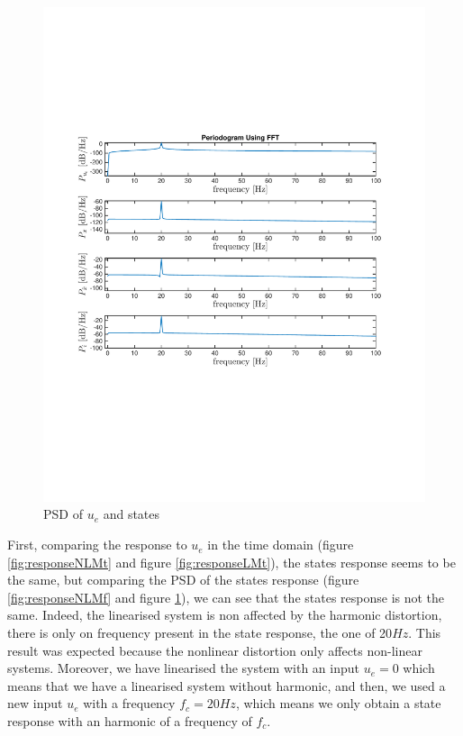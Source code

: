 \begin{figure}[H]
 \centering 
\includegraphics[trim=2cm 7cm 2cm 7cm, clip=true, totalheight=0.35\textheight, angle=0]{figures/responseLMf2.pdf}
\caption{PSD of $u_e$ and states}
\label{fig:responseLMf}
\end{figure}

First, comparing the response to $u_e$ in the time domain (figure \ref{fig:responseNLMt} and figure \ref{fig:responseLMt}), the states response seems to be the same, but comparing the PSD of the states response (figure \ref{fig:responseNLMf} and figure \ref{fig:responseLMf}), we can see that the states response is not the same. Indeed, the linearised system is non affected by the harmonic distortion, there is only on frequency present in the state response, the one of 20$Hz$.
This result was expected because the nonlinear distortion only affects non-linear systems. Moreover, we have linearised the system with an input $u_e=0$ which means that we have a linearised system without harmonic, and then, we used a new input $u_e$ with a frequency $f_c=20Hz$, which means we only obtain a state response with an harmonic of a frequency of $f_c$.





